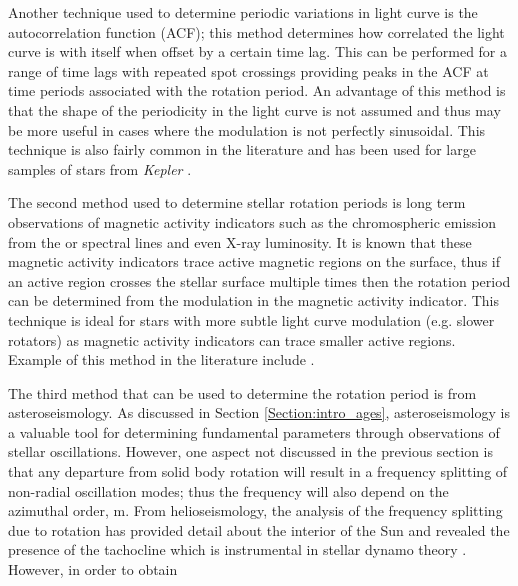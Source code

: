 Another technique used to determine periodic variations in light curve is the autocorrelation function (ACF); this method determines how correlated the light curve is with itself when offset by a certain time lag. This can be performed for a range of time lags with repeated spot crossings providing peaks in the ACF at time periods associated with the rotation period. An advantage of this method is that the shape of the periodicity in the light curve is not assumed and thus may be more useful in cases where the modulation is not perfectly sinusoidal. This technique is also fairly common in the literature and has been used for large samples of stars from \textit{Kepler} \citep{McQuillan_etal_2014}.

The second method used to determine stellar rotation periods is long term observations of magnetic activity indicators such as the chromospheric emission from the \caII or \Halpha spectral lines and even X-ray luminosity. It is known that these magnetic activity indicators trace active magnetic regions on the surface, thus if an active region crosses the stellar surface multiple times then the rotation period can be determined from the modulation in the magnetic activity indicator. This technique is ideal for stars with more subtle light curve modulation (e.g. slower rotators) as magnetic activity indicators can trace smaller active regions. Example of this method in the literature include \citet{Boro_Saikia_etal_2016,Robertson_etal_2015_GJ176,DeWarf_etal_2010}.

The third method that can be used to determine the rotation period is from asteroseismology. As discussed in Section \ref{Section:intro_ages}, asteroseismology is a valuable tool for determining fundamental parameters through observations of stellar oscillations. However, one aspect not discussed in the previous section is that any departure from solid body rotation will result in a frequency splitting of non-radial oscillation modes; thus the frequency will also depend on the azimuthal order, m. From helioseismology, the analysis of the frequency splitting due to rotation has provided detail about the interior of the Sun and revealed the presence of the tachocline which is instrumental in stellar dynamo theory \citep{Ossendrijver_2003}. However, in order to obtain 







































